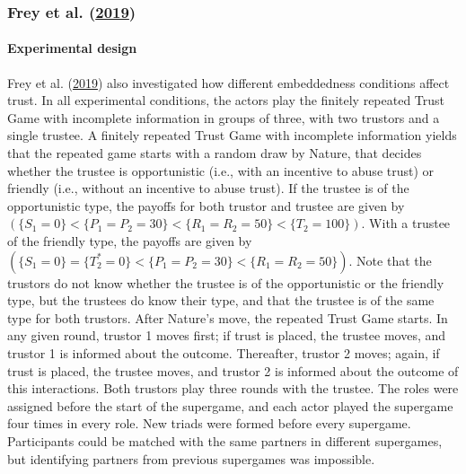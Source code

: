 \documentclass[
  11pt,
]{article}
\begin{document}
\hypertarget{frey_buskens_investments_2019}{%
\subsubsection{\texorpdfstring{Frey et al. (\protect\hyperlink{ref-frey_buskens_investments_2019}{2019})}{Frey et al. (2019)}}\label{frey_buskens_investments_2019}}

\hypertarget{experimental-design-6}{%
\paragraph{Experimental design}\label{experimental-design-6}}

Frey et al. (\protect\hyperlink{ref-frey_buskens_investments_2019}{2019}) also investigated how different embeddedness conditions affect trust. In all experimental conditions, the actors play the finitely repeated Trust Game with incomplete information in groups of three, with two trustors and a single trustee. A finitely repeated Trust Game with incomplete information yields that the repeated game starts with a random draw by Nature, that decides whether the trustee is opportunistic (i.e., with an incentive to abuse trust) or friendly (i.e., without an incentive to abuse trust). If the trustee is of the opportunistic type, the payoffs for both trustor and trustee are given by \((\{S_1 = 0\} < \{P_1 = P_2 = 30\} < \{R_1 = R_2 = 50\} < \{T_2 = 100\})\). With a trustee of the friendly type, the payoffs are given by \((\{S_1 = 0\} = \{T_2^{*} = 0\} < \{P_1 = P_2 = 30\} < \{R_1 = R_2 = 50\})\). Note that the trustors do not know whether the trustee is of the opportunistic or the friendly type, but the trustees do know their type, and that the trustee is of the same type for both trustors. After Nature's move, the repeated Trust Game starts. In any given round, trustor 1 moves first; if trust is placed, the trustee moves, and trustor 1 is informed about the outcome. Thereafter, trustor 2 moves; again, if trust is placed, the trustee moves, and trustor 2 is informed about the outcome of this interactions. Both trustors play three rounds with the trustee. The roles were assigned before the start of the supergame, and each actor played the supergame four times in every role. New triads were formed before every supergame. Participants could be matched with the same partners in different supergames, but identifying partners from previous supergames was impossible.
\end{document}
